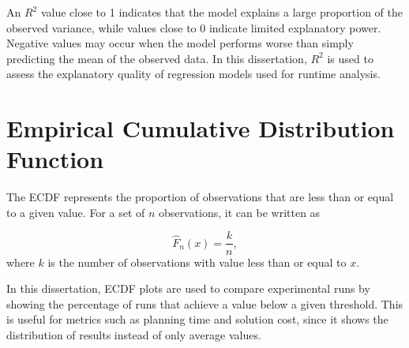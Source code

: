 An \(R^2\) value close to 1 indicates that the model explains a large proportion of the observed
variance, while values close to 0 indicate limited explanatory power. Negative values may occur
when the model performs worse than simply predicting the mean of the observed data. In this
dissertation, \(R^2\) is used to assess the explanatory quality of regression models used for
runtime analysis.

\section{Empirical Cumulative Distribution Function}
\label{app:ecdf}
\hspace{\parindent}
The ECDF represents the proportion of observations
that are less than or equal to a given value. For a set of \(n\) observations, it can be written as

\begin{equation}
    \hat{F}_n(x) = \frac{k}{n},
\end{equation}
where \(k\) is the number of observations with value less than or equal to \(x\).

In this dissertation, ECDF plots are used to compare experimental runs by showing the percentage of
runs that achieve a value below a given threshold. This is useful for metrics such as planning time
and solution cost, since it shows the distribution of results instead of only average values.